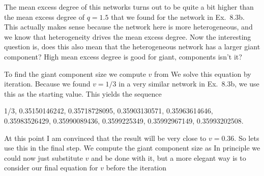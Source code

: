 The mean excess degree of this networks turns out to be quite a bit higher than the mean excess degree of $q=1.5$ that we found for the network in Ex.~8.3b. This actually makes sense because the network here is more heterogeneous, and we know that heterogeneity drives the mean excess degree. Now the interesting question is, does this also mean that the heterogeneous network has a larger giant component? High mean excess degree is good for giant, components isn't it? 

To find the giant component size we compute $v$ from 
We solve this equation by iteration. Because we found $v=1/3$ in a very similar network in Ex.~8.3b, we use this as the starting value. This yields the sequence 
\begin{center}
    1/3, 0.35150146242, 0.35718728095, 0.35903130571, 0.35963614646, 0.35983526429, 0.35990089436, 0.3599225349, 0.35992967149, 0.35993202508.      
\end{center}
At this point I am convinced that the result will be very close to $v=0.36$. So lets use this in the final step. We compute the giant component size as 
In principle we could now just substitute $v$ and be done with it, but a more elegant way is to consider our final equation for $v$ before the iteration
